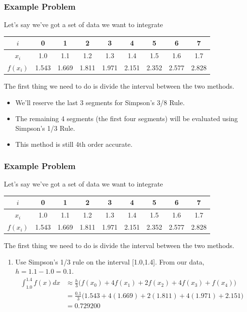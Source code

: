 \documentclass{if-beamer}
\begin{document}
\begin{frame}
	\frametitle{Example Problem}
	Let's say we've got a set of data we want to integrate
	\begin{table}
		\begin{tabular}{c| c c c c c c c c}
			$i$ &0& 1&2&3&4&5&6&7 \\
			\hline
			$x_i$& 1.0 &1.1&1.2&1.3&1.4&1.5&1.6&1.7\\
			$f(x_i)$&1.543&1.669&1.811&1.971&2.151&2.352&2.577&2.828\\
			
		\end{tabular}
	\end{table}
The first thing we need to do is divide the interval between the two methods. \\\vspace{5pt}
\begin{itemize}
	\item We'll reserve the last 3 segments for Simpson's 3/8 Rule.
	\item The remaining 4 segments (the first four segments) will be evaluated using Simpson's 1/3 Rule.
	\item This method is still 4th order accurate.
\end{itemize}
\end{frame}

\begin{frame}
	\frametitle{Example Problem}
	Let's say we've got a set of data we want to integrate
	\begin{table}
		\begin{tabular}{c| c c c c c c c c}
			$i$ &0& 1&2&3&4&5&6&7 \\
			\hline
			$x_i$& 1.0 &1.1&1.2&1.3&1.4&1.5&1.6&1.7\\
			$f(x_i)$&1.543&1.669&1.811&1.971&2.151&2.352&2.577&2.828\\
			
		\end{tabular}
	\end{table}
	The first thing we need to do is divide the interval between the two methods. \\\vspace{5pt}
 	\begin{enumerate}
 		\item Use Simpson's 1/3 rule on the interval [1.0,1.4]. From our data, $h = 1.1-1.0 = 0.1$.
 		\begin{align*}
 		\int_{1.0}^{1.4}f(x)dx &\approx\frac{h}{3}\bigg(f(x_0)+4f(x_1)+2f(x_2)+4f(x_3)+f(x_4)\bigg)\\
 		&=\frac{0.1}{3}\bigg(1.543+4(1.669)+2(1.811)+4(1.971)+2.151\bigg)\\
 		&=0.729200\\
 		\end{align*}
 	\end{enumerate}	
\end{frame}
\end{document}
